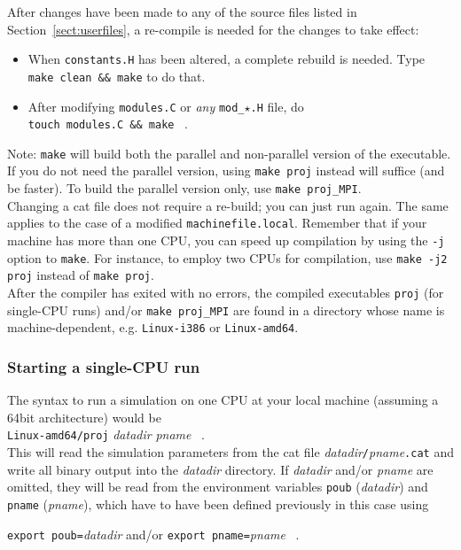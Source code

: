 After changes have been made to any of the source files listed in
Section~\ref{sect:userfiles}, a re-compile is needed for the changes to
take effect:
\begin{itemize}
\item When {\tt constants.H} has been altered, a complete rebuild
  is needed. Type \\
  \mbox{\tt make clean \&\& make} to do that. 
\item After modifying {\tt modules.C} or {\em any}
  {\tt mod\_$\star$.H} file, do\\
  \mbox{\tt touch modules.C \&\& make} \ . 
\end{itemize}
Note: {\tt make} will build both the parallel and non-parallel version
of the executable. If you do not need the parallel version, using
{\tt make proj} instead will suffice (and be faster). To build the
parallel version only, use \verb+make proj_MPI+.\\
Changing a cat file does not require a re-build; you can just run
again. The same applies to the case of a modified
{\tt machinefile.local}.
Remember that if your machine has more than one CPU, you can speed up
compilation by using the {\tt -j} option to {\tt make}. For instance,
to employ two CPUs for compilation, use \mbox{\tt make -j2 proj}
instead of \mbox{\tt make proj}.\\
After the compiler has exited with no errors, the compiled executables
{\tt proj} (for single-CPU runs) and/or \verb+make proj_MPI+ are found in a
directory whose name is machine-dependent, e.g. 
{\tt Linux-i386} or {\tt Linux-amd64}.

\subsubsection{Starting a single-CPU run}

The syntax to run a simulation on one CPU at your local machine
(assuming a 64bit architecture) would be \\
{\tt Linux-amd64/proj} {\it datadir} {\it pname} \ .\\
This will read the simulation parameters from the cat file
{\it datadir}{\tt /}{\it pname}{\tt.cat} and write all binary output
into the {\it datadir} directory.
If {\it datadir} and/or {\it pname} are omitted, they will be read
from the environment variables {\tt poub} ({\it datadir}) and
{\tt pname} ({\it  pname}), which have to have been defined previously
in this case using\\
\centerline{{\tt export poub=}{\it datadir} \quad and/or \quad
{\tt export pname=}{\it pname} \ .}

